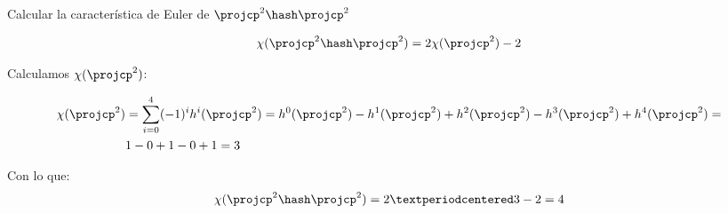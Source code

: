 \begin{problem}[6]

Calcular la característica de Euler de $\projcp^2\hash\projcp^2$

\solution
{}

\[
	\chi(\projcp^2\hash\projcp^2) = 2\chi(\projcp^2) - 2
\]

Calculamos $\chi(\projcp^2)$:

\begin{align*}
	\chi(\projcp^2) &= \sum_{i=0}^4 (-1)^i h^i(\projcp^2) = h^0(\projcp^2) - h^1(\projcp^2) + h^2(\projcp^2) - h^3(\projcp^2) + h^4(\projcp^2) =\\
	&1-0+1-0+1 = 3
\end{align*}

Con lo que:
\[
	\chi(\projcp^2\hash\projcp^2) = 2·3 - 2 = 4
\]

\end{problem}

